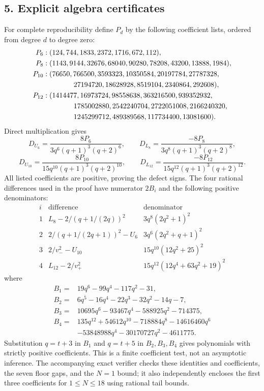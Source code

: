 \documentclass[11pt]{article}
\begin{document}
\subsection*{5. Explicit algebra certificates}
For complete reproducibility define $P_d$ by the following coefficient
lists, ordered from degree $d$ to degree zero:
\begin{align*}
 P_6:\;&(124,744,1833,2372,1716,672,112),\\
 P_8:\;&(1143,9144,32676,68040,90280,78208,43200,13888,1984),\\
 P_{10}:\;&(76650,766500,3593323,10350584,20197784,27787328,\\
 &\hspace{12mm}27194720,18628928,8519104,2340864,292608),\\
 P_{12}:\;&(1414477,16973724,98558638,363216500,939352932,\\
 &\hspace{12mm}1785002880,2542240704,2722051008,2166240320,\\
 &\hspace{12mm}1245299712,489389568,117734400,13081600).
\end{align*}
Direct multiplication gives
\[
 D_{U_6}=\frac{8P_6}{3q^6(q+1)^3(q+2)^6},\qquad
 D_{L_8}=\frac{-8P_8}{3q^8(q+1)^3(q+2)^8},
\]
\[
 D_{U_{10}}=\frac{8P_{10}}{15q^{10}(q+1)^3(q+2)^{10}},\qquad
 D_{L_{12}}=\frac{-8P_{12}}{15q^{12}(q+1)^3(q+2)^{12}}.
\]
All listed coefficients are positive, proving the defect signs.
The four rational differences used in the proof have numerator $2B_i$
and the following positive denominators:
\[
\begin{array}{c|c|c}
i&\text{difference}&\text{denominator}\\ \hline
1&L_8-2/(q+1/(2q))^2&3q^8(2q^2+1)^2\\
2&2/(q+1/(2q+1))^2-U_6&3q^6(2q^2+q+1)^2\\
3&2/v_-^2-U_{10}&15q^{10}(12q^2+25)^2\\
4&L_{12}-2/v_+^2&15q^{12}(12q^4+63q^2+19)^2
\end{array}
\]
where
\begin{align*}
 B_1={}&19q^6-99q^4-117q^2-31,\\
 B_2={}&6q^5-16q^4-22q^3-32q^2-14q-7,\\
 B_3={}&10695q^6-93467q^4-588925q^2-714375,\\
 B_4={}&135q^{12}+54612q^{10}-718884q^8-14616460q^6\\
       &-53848988q^4-30170727q^2-4611775.
\end{align*}
Substitution $q=t+3$ in $B_1$ and $q=t+5$ in $B_2,B_3,B_4$
gives polynomials with strictly positive coefficients.
This is a finite coefficient test, not an asymptotic inference.
The accompanying exact verifier checks these identities and
coefficients, the seven floor gaps, and the $N=1$ bound; it also
independently encloses the first three coefficients for $1\le N\le18$
using rational tail bounds.
\end{document}
